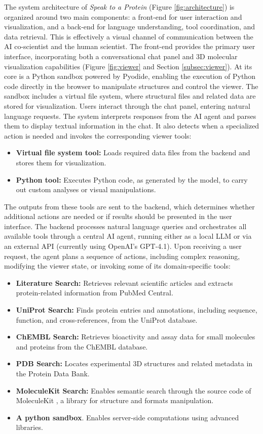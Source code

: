 \documentclass{article}
\begin{document}
The system architecture of \emph{Speak to a Protein} (Figure \ref{fig:architecture}) is organized around two main components: a front-end for user interaction and visualization, and a back-end for language understanding, tool coordination, and data retrieval.
This is effectively a visual channel of communication between the AI co-scientist and the human scientist. The front-end provides the primary user interface, incorporating both a conversational chat panel and 3D molecular visualization capabilities (Figure \ref{fig:viewer} and Section \ref{subsec:viewer}). At its core is a Python sandbox powered by Pyodide, enabling the execution of Python code directly in the browser to manipulate structures and control the viewer. The sandbox includes a virtual file system, where structural files and related data are stored for visualization.
Users interact through the chat panel, entering natural language requests. The system interprets responses from the AI agent and parses them to display textual information in the chat. It also detects when a specialized action is needed and invokes the corresponding viewer tools:
\begin{itemize}[leftmargin=1em]
\item \textbf{Virtual file system tool:} Loads required data files from the backend and stores them for visualization.
\item \textbf{Python tool:} Executes Python code, as generated by the model, to carry out custom analyses or visual manipulations.
\end{itemize}

The outputs from these tools are sent to the backend, which determines whether additional actions are needed or if results should be presented in the user interface. The backend processes natural language queries and orchestrates all available tools through a central AI agent, running either as a local LLM or via an external API (currently using OpenAI's GPT-4.1). Upon receiving a user request, the agent plans a sequence of actions, including complex reasoning, modifying the viewer state, or invoking some of its domain-specific tools:

\begin{itemize}[leftmargin=1em]
\item \textbf{Literature Search:} Retrieves relevant scientific articles and extracts protein-related information from PubMed Central.
\item \textbf{UniProt Search:} Finds protein entries and annotations, including sequence, function, and cross-references, from the UniProt database.
\item \textbf{ChEMBL Search:} Retrieves bioactivity and assay data for small molecules and proteins from the ChEMBL database.
\item \textbf{PDB Search:} Locates experimental 3D structures and related metadata in the Protein Data Bank.
\item \textbf{MoleculeKit Search:} Enables semantic search through the source code of MoleculeKit \citep{Doerr2016}, a library for structure and formats manipulation.
\item \textbf{A python sandbox}. Enables server-side computations using advanced libraries.
\end{itemize}
\end{document}
